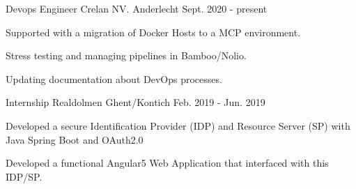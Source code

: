 

\begin{cventries}

  \cvlistentry
    {Devops Engineer} %
    {Crelan NV.} %
    {Anderlecht} %
    {Sept. 2020 - present} %
    {
      \begin{cvitems} %
	    \item {Supported with a migration of Docker Hosts to a MCP environment.}
	    \item {Stress testing and managing pipelines in Bamboo/Nolio.}
	    \item {Updating documentation about DevOps processes.}
      \end{cvitems}
  	}

  \cvlistentry
    {Internship} %
    {Realdolmen} %
    {Ghent/Kontich} %
    {Feb. 2019 - Jun. 2019} %
    {
      \begin{cvitems} %
	    \item {Developed a secure Identification Provider (IDP) and Resource Server (SP) with Java Spring Boot and OAuth2.0}
        \item {Developed a functional Angular5 Web Application that interfaced with this IDP/SP.}
      \end{cvitems}
    }

\end{cventries}
